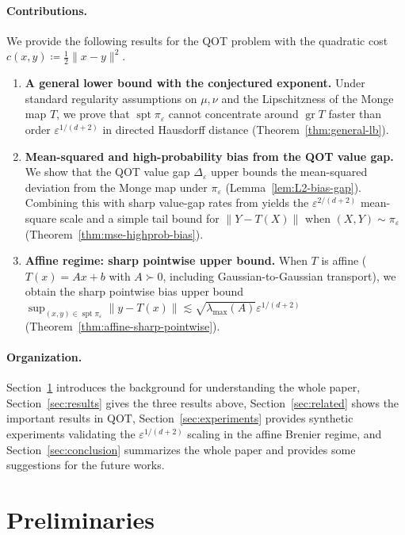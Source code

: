 \documentclass{article}
\theoremstyle{plain}
\theoremstyle{definition}
\theoremstyle{remark}
\numberwithin{equation}{section}
\DeclareMathOperator{\spt}{spt}
\DeclareMathOperator{\gr}{gr}
\begin{document}
\paragraph{Contributions.}
We provide the following results for the QOT problem with the quadratic cost $c(x,y)\coloneqq\frac12\|x-y\|^2$.
\begin{enumerate}[leftmargin=15pt]
\item \textbf{A general lower bound with the conjectured exponent.}
Under standard regularity assumptions on $\mu,\nu$ and the Lipschitzness of the Monge map $T$, we prove that $\spt\pi_\varepsilon$ cannot concentrate around $\gr T$ faster than order $\varepsilon^{1/(d+2)}$ in directed Hausdorff distance (Theorem~\ref{thm:general-lb}).
\item \textbf{Mean-squared and high-probability bias from the QOT value gap.}
We show that the QOT value gap $\Delta_\varepsilon$ upper bounds the mean-squared deviation from the Monge map under $\pi_\varepsilon$ (Lemma~\ref{lem:L2-bias-gap}).
Combining this with sharp value-gap rates from \citet{eckstein2024convergence} yields the $\varepsilon^{2/(d+2)}$ mean-square scale and a simple tail bound for $\|Y-T(X)\|$ when $(X,Y)\sim\pi_\varepsilon$ (Theorem~\ref{thm:mse-highprob-bias}).
\item \textbf{Affine regime: sharp pointwise upper bound.}
When $T$ is affine ($T(x)=Ax+b$ with $A\succ 0$, including Gaussian-to-Gaussian transport), we obtain the sharp pointwise bias upper bound $\sup_{(x,y)\in\spt\pi_\varepsilon}\|y-T(x)\|\lesssim\sqrt{\lambda_{\max}(A)}\varepsilon^{1/(d+2)}$ (Theorem~\ref{thm:affine-sharp-pointwise}).
\end{enumerate}
\paragraph{Organization.}
Section~\ref{sec:preliminaries} introduces the background for understanding the whole paper, Section~\ref{sec:results} gives the three results above, Section~\ref{sec:related} shows the important results in QOT, Section~\ref{sec:experiments} provides synthetic experiments validating the $\varepsilon^{1/(d+2)}$ scaling in the affine Brenier regime, and Section~\ref{sec:conclusion} summarizes the whole paper and provides some suggestions for the future works.

\section{Preliminaries}\label{sec:preliminaries}
\end{document}
